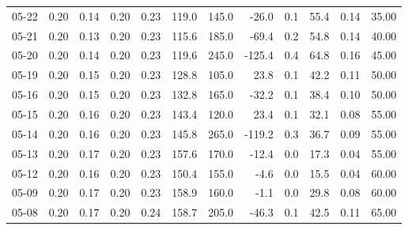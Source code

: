 \begin{threeparttable}
{\begin{tabular}{lrrrrrrrrrrr}
  05-22 &          0.20 &          0.14 &          0.20 &        0.23 &               119.0 &               145.0 &      -26.0 &                 0.1 &             55.4 &            0.14 &                  35.00 \\
  05-21 &          0.20 &          0.13 &          0.20 &        0.23 &               115.6 &               185.0 &      -69.4 &                 0.2 &             54.8 &            0.14 &                  40.00 \\
  05-20 &          0.20 &          0.14 &          0.20 &        0.23 &               119.6 &               245.0 &     -125.4 &                 0.4 &             64.8 &            0.16 &                  45.00 \\
  05-19 &          0.20 &          0.15 &          0.20 &        0.23 &               128.8 &               105.0 &       23.8 &                 0.1 &             42.2 &            0.11 &                  50.00 \\
  05-16 &          0.20 &          0.15 &          0.20 &        0.23 &               132.8 &               165.0 &      -32.2 &                 0.1 &             38.4 &            0.10 &                  50.00 \\
  05-15 &          0.20 &          0.16 &          0.20 &        0.23 &               143.4 &               120.0 &       23.4 &                 0.1 &             32.1 &            0.08 &                  55.00 \\
  05-14 &          0.20 &          0.16 &          0.20 &        0.23 &               145.8 &               265.0 &     -119.2 &                 0.3 &             36.7 &            0.09 &                  55.00 \\
  05-13 &          0.20 &          0.17 &          0.20 &        0.23 &               157.6 &               170.0 &      -12.4 &                 0.0 &             17.3 &            0.04 &                  55.00 \\
  05-12 &          0.20 &          0.16 &          0.20 &        0.23 &               150.4 &               155.0 &       -4.6 &                 0.0 &             15.5 &            0.04 &                  60.00 \\
  05-09 &          0.20 &          0.17 &          0.20 &        0.23 &               158.9 &               160.0 &       -1.1 &                 0.0 &             29.8 &            0.08 &                  60.00 \\
  05-08 &          0.20 &          0.17 &          0.20 &        0.24 &               158.7 &               205.0 &      -46.3 &                 0.1 &             42.5 &            0.11 &                  65.00 \\

\end{tabular}}
\end{threeparttable}
